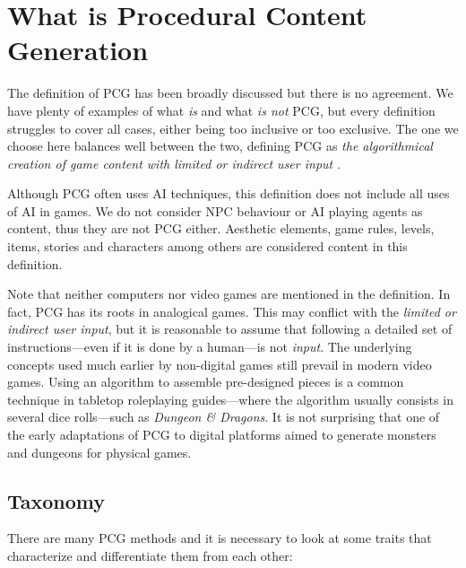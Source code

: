 \section{What is Procedural Content Generation}
The definition of \acf{PCG} has been broadly discussed but there is no agreement. We have plenty of examples of what \textit{is} and what \textit{is not} \ac{PCG}, but every definition struggles to cover all cases, either being too inclusive or too exclusive. The one we choose here balances well between the two, defining \ac{PCG} as \textit{the algorithmical creation of game content with limited or indirect user input} \cite{togelius2011procedural}.

Although \ac{PCG} often uses AI techniques, this definition does not include all uses of AI in games. We do not consider \acs{NPC} behaviour or AI playing agents as content, thus they are not \ac{PCG} either. Aesthetic elements, game rules, levels, items, stories and characters among others are considered content in this definition.

Note that neither computers nor video games are mentioned in the definition. In fact, \ac{PCG} has its roots in analogical games. This may conflict with the \textit{limited or indirect user input}, but it is reasonable to assume that following a detailed set of instructions---even if it is done by a human---is not \textit{input}. The underlying concepts used much earlier by non-digital games still prevail in modern video games. Using an algorithm to assemble pre-designed pieces is a common technique in tabletop roleplaying guides---where the algorithm usually consists in several dice rolls---such as \textit{Dungeon \& Dragons}. It is not surprising that one of the early adaptations of \ac{PCG} to digital platforms aimed to generate monsters and dungeons for physical games.\cite{smith2015analog}

\subsection{Taxonomy}
There are many \ac{PCG} methods and it is necessary to look at some traits that characterize and differentiate them from each other: \cite{togelius2016introduction}

